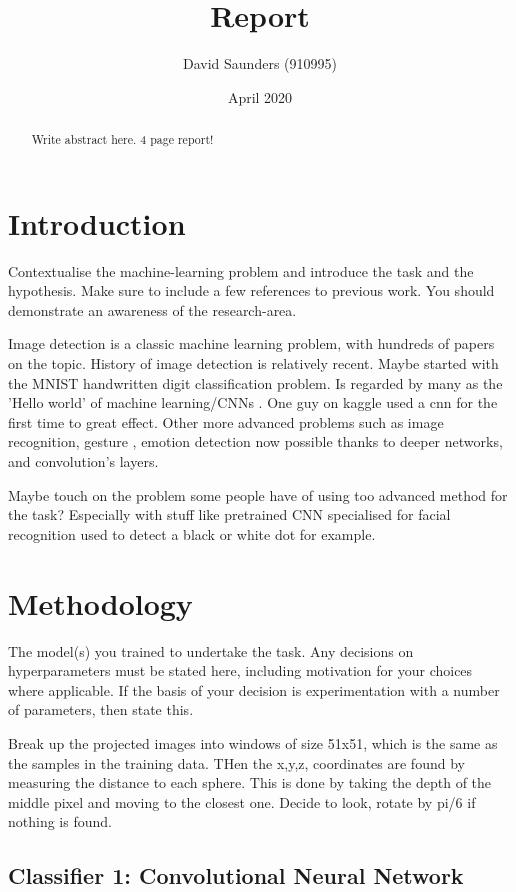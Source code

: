 \documentclass{article}
\title{Report}
\author{David Saunders (910995)}
\date{April 2020}
\begin{document}
\maketitle

\begin{abstract} 
    Write abstract here. 4 page report!
\end{abstract}

\tableofcontents

\section{Introduction}

Contextualise the machine-learning problem and introduce the
task and the hypothesis. Make sure to include a few references to previous
work. You should demonstrate an awareness of the research-area.

Image detection is a classic machine learning problem, with hundreds of papers on the topic. 
History of image detection is relatively recent.
Maybe started with the MNIST handwritten digit classification problem.
Is regarded by many as the 'Hello world' of machine learning/CNNs \cite{tensorflow_2020}.
One guy on kaggle used a cnn for the first time to great effect.
Other more advanced problems such as image recognition, gesture
    , emotion detection now possible thanks to deeper networks, and convolution's layers.


Maybe touch on the problem some people have of using too advanced method for the task?
Especially with stuff like pretrained CNN specialised for facial recognition used to detect a black or white dot for example.


\section{Methodology}
The model(s) you trained to undertake the task. Any decisions
on hyperparameters must be stated here, including motivation for your
choices where applicable. If the basis of your decision is experimentation
with a number of parameters, then state this.

Break up the projected images into windows of size 51x51, which is the same as the samples in the training data.
THen the x,y,z, coordinates are found by measuring the distance to each sphere.
This is done by taking the depth of the middle pixel and moving to the closest one.
Decide to look, rotate by pi/6 if nothing is found.

\subsection{Classifier 1: Convolutional Neural Network}
\end{document}
